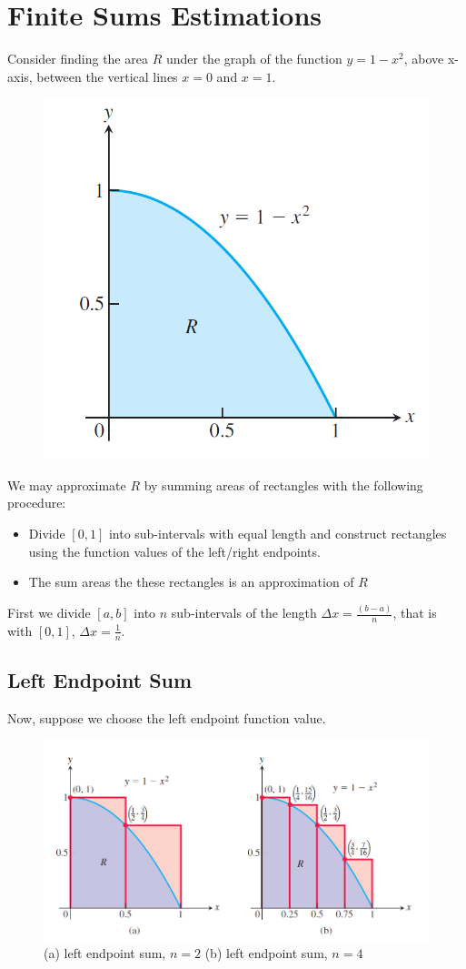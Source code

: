 \documentclass[12pt]{article}
\begin{document}
\section{Finite Sums Estimations}
Consider finding the area $R$ under the graph of the function $y = 1-x^2$, above x-axis, between the vertical lines 
$x = 0$ and $x = 1$.

\begin{figure}[h!]
    \centering
    \includegraphics[width = 0.3\linewidth]{Images/area with summing.png}
\end{figure}

We may approximate $R$ by summing areas of rectangles with the following procedure: 
\begin{itemize} 
     \item Divide $[0,1]$ into sub-intervals with equal length and construct rectangles using the function values of the left/right endpoints.
     \item The sum areas the these rectangles is an approximation of $R$
\end{itemize}

First we divide $[a, b]$ into $n$ sub-intervals of the length $\Delta x = \frac{(b - a)}{n}$, that is 
with $[0, 1]$, $\Delta x = \frac{1}{n}$.
\subsection{Left Endpoint Sum}
Now, suppose we choose the left endpoint function value.
\begin{figure}[h!]
    \centering
    \includegraphics[width = 0.7\linewidth]{Images/left summing.png}
    \caption{(a) left endpoint sum, $n = 2$ (b) left endpoint sum, $n = 4$}
\end{figure}
\end{document}
